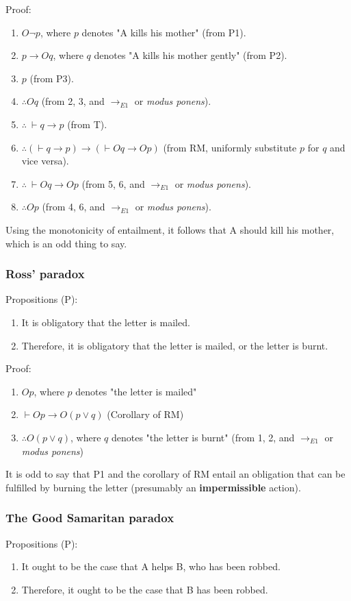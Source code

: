 \documentclass[11pt]{article}
\begin{document}
Proof:
\begin{enumerate}
\item \(O \neg p\), where \(p\) denotes "A kills his mother" (from P1).
\item \(p \rightarrow Oq\), where \(q\) denotes "A kills his mother gently" (from P2).
\item \(p\) (from P3).
\item \(\therefore Oq\) (from 2, 3, and \(\rightarrow_{E1}\) or \emph{modus ponens}).
\item \(\therefore \ \vdash q \rightarrow p\) (from T).
\item \(\therefore (\vdash q \rightarrow p) \rightarrow (\vdash Oq \rightarrow Op)\) (from RM, uniformly substitute \(p\) for \(q\) and vice versa).
\item \(\therefore \ \vdash Oq \rightarrow Op\) (from 5, 6, and \(\rightarrow_{E1}\) or \emph{modus ponens}).
\item \(\therefore Op\) (from 4, 6, and \(\rightarrow_{E1}\) or \emph{modus ponens}).
\end{enumerate}

Using the monotonicity of entailment, it follows that A should kill his mother, which is an odd thing to say.
\subsubsection{Ross' paradox}
\label{sec:org3a64fd1}
Propositions (P):
\begin{enumerate}
\item It is obligatory that the letter is mailed.
\item Therefore, it is obligatory that the letter is mailed, or the letter is burnt.
\end{enumerate}

Proof:
\begin{enumerate}
\item \(Op\), where \(p\) denotes "the letter is mailed"
\item \(\vdash Op \rightarrow O(p \vee q)\) (Corollary of RM)
\item \(\therefore O(p \vee q)\), where \(q\) denotes "the letter is burnt" (from 1, 2, and \(\rightarrow_{E1}\) or \emph{modus ponens})
\end{enumerate}

It is odd to say that P1 and the corollary of RM entail an obligation that can be fulfilled by burning the letter (presumably an \textbf{impermissible} action).
\subsubsection{The Good Samaritan paradox}
\label{sec:orgb706355}
Propositions (P):
\begin{enumerate}
\item It ought to be the case that A helps B, who has been robbed.
\item Therefore, it ought to be the case that B has been robbed.
\end{enumerate}
\end{document}
